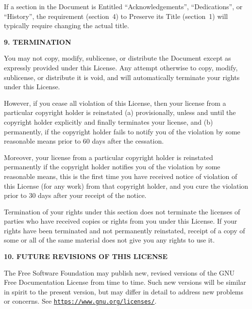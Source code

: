 \documentclass{article}
\begin{document}
	If a section in the Document is Entitled ``Acknowledgements'',
	``Dedications'', or ``History'', the requirement (section~4) to Preserve
	its Title (section~1) will typically require changing the actual
	title.
	
	
	\begin{center}
		{\Large\bf 9. TERMINATION\par}
	\end{center}
	
	
	You may not copy, modify, sublicense, or distribute the Document
	except as expressly provided under this License.  Any attempt
	otherwise to copy, modify, sublicense, or distribute it is void, and
	will automatically terminate your rights under this License.
	
	However, if you cease all violation of this License, then your license
	from a particular copyright holder is reinstated (a) provisionally,
	unless and until the copyright holder explicitly and finally
	terminates your license, and (b) permanently, if the copyright holder
	fails to notify you of the violation by some reasonable means prior to
	60 days after the cessation.
	
	Moreover, your license from a particular copyright holder is
	reinstated permanently if the copyright holder notifies you of the
	violation by some reasonable means, this is the first time you have
	received notice of violation of this License (for any work) from that
	copyright holder, and you cure the violation prior to 30 days after
	your receipt of the notice.
	
	Termination of your rights under this section does not terminate the
	licenses of parties who have received copies or rights from you under
	this License.  If your rights have been terminated and not permanently
	reinstated, receipt of a copy of some or all of the same material does
	not give you any rights to use it.
	
	
	\begin{center}
		{\Large\bf 10. FUTURE REVISIONS OF THIS LICENSE\par}
	\end{center}
	
	
	The Free Software Foundation may publish new, revised versions
	of the GNU Free Documentation License from time to time.  Such new
	versions will be similar in spirit to the present version, but may
	differ in detail to address new problems or concerns.  See
	\href{https://www.gnu.org/licenses/}{\texttt{https://www.gnu.org/licenses/}}.
	
\end{document}
